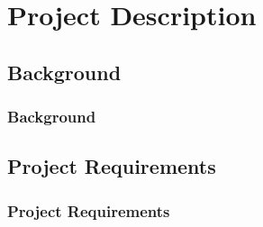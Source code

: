 \section{Project Description}

\subsection{Background}
\begin{frame}
\frametitle{Background}


\end{frame}

\subsection{Project Requirements}
\begin{frame}
\frametitle{Project Requirements}


\end{frame}
